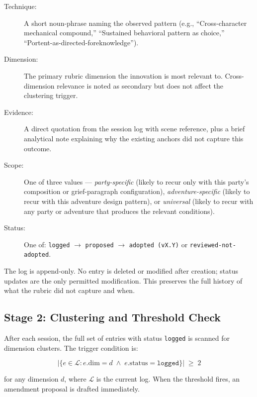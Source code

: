 \begin{description}
  \item[Technique:] A short noun-phrase naming the observed pattern
    (e.g., ``Cross-character mechanical compound,'' ``Sustained behavioral
    pattern as choice,'' ``Portent-as-directed-foreknowledge'').

  \item[Dimension:] The primary rubric dimension the innovation is most
    relevant to. Cross-dimension relevance is noted as secondary but does not
    affect the clustering trigger.

  \item[Evidence:] A direct quotation from the session log with scene
    reference, plus a brief analytical note explaining why the existing anchors
    did not capture this outcome.

  \item[Scope:] One of three values --- \textit{party-specific} (likely to
    recur only with this party's composition or grief-paragraph configuration),
    \textit{adventure-specific} (likely to recur with this adventure design
    pattern), or \textit{universal} (likely to recur with any party or
    adventure that produces the relevant conditions).

  \item[Status:] One of: \texttt{logged} $\to$ \texttt{proposed} $\to$
    \texttt{adopted (vX.Y)} or \texttt{reviewed-not-adopted}.
\end{description}

The log is append-only. No entry is deleted or modified after creation; status
updates are the only permitted modification. This preserves the full history of
what the rubric did not capture and when.

\subsection{Stage 2: Clustering and Threshold Check}

After each session, the full set of entries with status \texttt{logged} is
scanned for dimension clusters. The trigger condition is:

\[
  \bigl|\{e \in \mathcal{L} : e.\mathrm{dim} = d
          \;\wedge\; e.\mathrm{status} = \texttt{logged}\}\bigr| \;\geq\; 2
\]

for any dimension $d$, where $\mathcal{L}$ is the current log. When the
threshold fires, an amendment proposal is drafted immediately.

